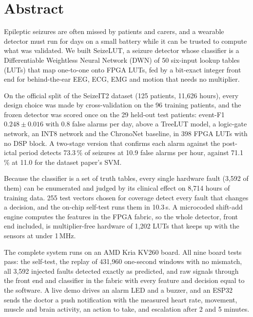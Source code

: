 \chapter*{Abstract}

Epileptic seizures are often missed by patients and carers, and a wearable detector must run for days on a small
battery while it can be trusted to compute what was validated. We built SeizeLUT, a seizure detector whose classifier
is a Differentiable Weightless Neural Network (DWN) of 50 six-input lookup tables (LUTs) that map one-to-one onto
FPGA LUTs, fed by a bit-exact integer front end for behind-the-ear EEG, ECG, EMG and motion that needs no multiplier.

On the official split of the SeizeIT2 dataset (125 patients, 11,626 hours), every design choice was made by
cross-validation on the 96 training patients, and the frozen detector was scored once on the 29 held-out test
patients: event-F1 $0.248 \pm 0.016$ with 0.8 false alarms per day, above a TreeLUT model, a logic-gate network, an
INT8 network and the ChronoNet baseline, in 398 FPGA LUTs with no DSP block. A two-stage version that confirms each
alarm against the post-ictal period detects 73.3\,\% of seizures at 10.9 false alarms per hour, against 71.1\,\% at
11.0 for the dataset paper's SVM.

Because the classifier is a set of truth tables, every single hardware fault (3,592 of them) can be enumerated and
judged by its clinical effect on 8,714 hours of training data. 255 test vectors chosen for coverage detect every
fault that changes a decision, and the on-chip self-test runs them in 10.3\,\textmu s. A microcoded shift-add engine
computes the features in the FPGA fabric, so the whole detector, front end included, is multiplier-free hardware of
1,202 LUTs that keeps up with the sensors at under 1\,MHz.

The complete system runs on an AMD Kria KV260 board. All nine board tests pass: the self-test, the replay of 431,960
one-second windows with no mismatch, all 3,592 injected faults detected exactly as predicted, and raw signals through
the front end and classifier in the fabric with every feature and decision equal to the software. A live demo drives
an alarm LED and a buzzer, and an ESP32 sends the doctor a push notification with the measured heart rate, movement,
muscle and brain activity, an action to take, and escalation after 2 and 5 minutes.
